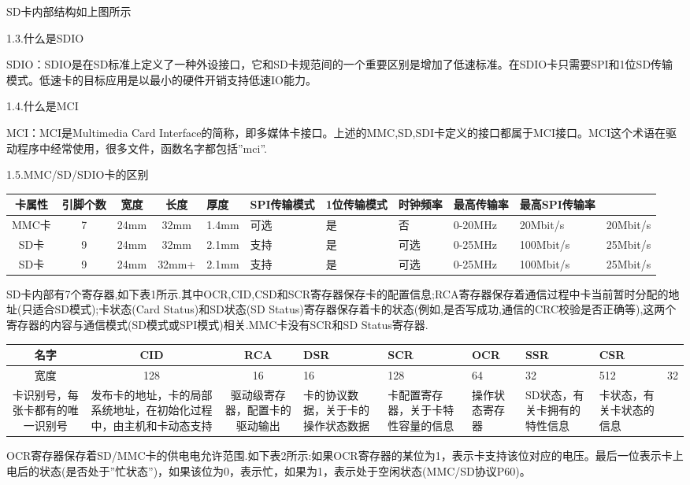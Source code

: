SD卡内部结构如上图所示

1.3.什么是SDIO

SDIO：SDIO是在SD标准上定义了一种外设接口，它和SD卡规范间的一个重要区别是增加了低速标准。在SDIO卡只需要SPI和1位SD传输模式。低速卡的目标应用是以最小的硬件开销支持低速IO能力。

1.4.什么是MCI

MCI：MCI是Multimedia Card Interface的简称，即多媒体卡接口。上述的MMC,SD,SDI卡定义的接口都属于MCI接口。MCI这个术语在驱动程序中经常使用，很多文件，函数名字都包括”mci”.

1.5.MMC/SD/SDIO卡的区别


\begin{tabular}{|c|c|c|c|}
    
    \hline
    卡属性&引脚个数&宽度&长度&厚度&SPI传输模式&1位传输模式&时钟频率&最高传输率&最高SPI传输率\\
    \hline
    MMC卡&7&24mm&32mm&1.4mm&可选&是&否&0-20MHz&20Mbit/s&20Mbit/s \\
    \hline
    SD卡&9&24mm&32mm&2.1mm&支持&是&可选&0-25MHz&100Mbit/s&25Mbit/s \\
    \hline
    SD卡&9&24mm&32mm+&2.1mm&支持&是&可选&0-25MHz&100Mbit/s&25Mbit/s \\
    \hline
  \end{tabular}

SD卡内部有7个寄存器,如下表1所示.其中OCR,CID,CSD和SCR寄存器保存卡的配置信息;RCA寄存器保存着通信过程中卡当前暂时分配的地址(只适合SD模式);卡状态(Card Status)和SD状态(SD Status)寄存器保存着卡的状态(例如,是否写成功,通信的CRC校验是否正确等),这两个寄存器的内容与通信模式(SD模式或SPI模式)相关.MMC卡没有SCR和SD Status寄存器.

\begin{tabular}{|c|c|c|}    

    \hline
    名字 & CID & RCA & DSR & SCR & OCR &SSR &CSR \\
    \hline
    宽度 & 128 & 16 & 16 & 128 & 64 & 32 & 512 & 32 \\
    \hline
    卡识别号，每张卡都有的唯一识别号 & 发布卡的地址，卡的局部系统地址，在初始化过程中，由主机和卡动态支持 & 驱动级寄存器，配置卡的驱动输出 &
    卡的协议数据，关于卡的操作状态数据 & 卡配置寄存器，关于卡特性容量的信息 & 操作状态寄存器&
    SD状态，有关卡拥有的特性信息 & 卡状态，有关卡状态的信息 \\
    \hline
\end{tabular}

OCR寄存器保存着SD/MMC卡的供电电允许范围.如下表2所示:如果OCR寄存器的某位为1，表示卡支持该位对应的电压。最后一位表示卡上电后的状态(是否处于”忙状态”)，如果该位为0，表示忙，如果为1，表示处于空闲状态(MMC/SD协议P60)。


